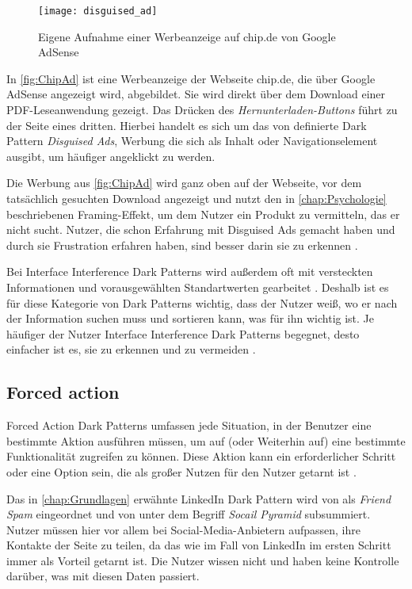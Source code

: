 \documentclass[conference,compsoc,final,a4paper]{IEEEtran}
\begin{document}
\begin{figure}[!ht]
  \centering
  \texttt{[image: disguised\_ad]}
  \caption{Eigene Aufnahme einer Werbeanzeige auf chip.de von Google AdSense~\autocite{ChipAd}}
  \label{fig:ChipAd}
\end{figure}

In \autoref{fig:ChipAd} ist eine Werbeanzeige der Webseite chip.de, die über Google AdSense angezeigt wird, abgebildet. Sie wird direkt über dem Download einer PDF-Leseanwendung gezeigt. Das Drücken des \textit{Hernunterladen-Buttons} führt zu der Seite eines dritten. Hierbei handelt es sich um das von \citeauthor{Brignull} \autocite{Brignull} definierte Dark Pattern \textit{Disguised Ads}, Werbung die sich als Inhalt oder Navigationselement ausgibt, um häufiger angeklickt zu werden.

Die Werbung aus \autoref{fig:ChipAd} wird ganz oben auf der Webseite, vor dem tatsächlich gesuchten Download angezeigt und nutzt den in \autoref{chap:Psychologie} beschriebenen Framing-Effekt, um dem Nutzer ein Produkt zu vermitteln, das er nicht sucht. Nutzer, die schon Erfahrung mit Disguised Ads gemacht haben und durch sie Frustration erfahren haben, sind besser darin sie zu erkennen \autocite{M.Bhoot2020}.

Bei Interface Interference Dark Patterns wird außerdem oft mit versteckten Informationen und vorausgewählten Standartwerten gearbeitet \autocite{Gray_2018}. Deshalb ist es für diese Kategorie von Dark Patterns wichtig, dass der Nutzer weiß, wo er nach der Information suchen muss und sortieren kann, was für ihn wichtig ist. Je häufiger der Nutzer Interface Interference Dark Patterns begegnet, desto einfacher ist es, sie zu erkennen und zu vermeiden \autocite{M.Bhoot2020}.

\subsection{Forced action}
Forced Action Dark Patterns umfassen jede Situation, in der Benutzer eine bestimmte Aktion ausführen müssen, um auf (oder Weiterhin auf) eine bestimmte Funktionalität zugreifen zu können. Diese Aktion kann ein erforderlicher Schritt oder eine Option sein, die als großer Nutzen für den Nutzer getarnt ist \autocite{Gray_2018}.

Das in \autoref{chap:Grundlagen} erwähnte LinkedIn Dark Pattern wird von \citeauthor{Brignull} \autocite{Brignull} als \textit{Friend Spam} eingeordnet und von \citeauthor*{Gray_2018} \autocite{Gray_2018} unter dem Begriff \textit{Socail Pyramid} subsummiert. Nutzer müssen hier vor allem bei Social-Media-Anbietern aufpassen, ihre Kontakte der Seite zu teilen, da das wie im Fall von LinkedIn im ersten Schritt immer als Vorteil getarnt ist. Die Nutzer wissen nicht und haben keine Kontrolle darüber, was mit diesen Daten passiert.
\end{document}
